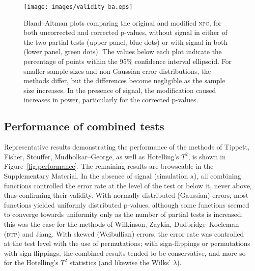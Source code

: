 \begin{figure}[p]
\begin{center}
\centerline{\texttt{[image: images/validity\_ba.eps]}}
\end{center}
\vspace{-3mm}
\caption{Bland--Altman plots comparing the original and modified \textsc{npc}, for both uncorrected and corrected p-values, without signal in either of the two partial tests (upper panel, blue dots) or with signal in both (lower panel, green dots). The values below each plot indicate the percentage of points within the 95\% confidence interval ellipsoid. For smaller sample sizes and non-Gaussian error distributions, the methods differ, but the differences become negligible as the sample size increases. In the presence of signal, the modification caused increases in power, particularly for the corrected p-values.}
\label{fig:validity_ba}
\end{figure}

\subsection{Performance of combined tests}

Representative results demonstrating the performance of the methods of Tippett, Fisher, Stouffer, Mudholkar--George, as well as Hotelling's $T^2$, is shown in Figure~\ref{fig:performance}. The remaining results are browseable in the Supplementary Material. In the absence of signal (simulation \textsc{a}), all combining functions controlled the error rate at the level of the test or below it, never above, thus confirming their validity. With normally distributed (Gaussian) errors, most functions yielded uniformly distributed p-values, although some functions seemed to converge towards uniformity only as the number of partial tests is increased; this was the case for the methods of Wilkinson, Zaykin, Dudbridge--Koeleman (\textsc{dtp}) and Jiang. With skewed (Weibullian) errors, the error rate was controlled at the test level with the use of permutations; with sign-flippings or permutations with sign-flippings, the combined results tended to be conservative, and more so for the Hotelling's $T^2$ statistics (and likewise the Wilks' $\lambda$).

